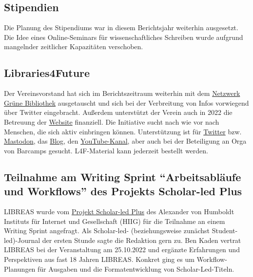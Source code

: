 \documentclass[a4paper,
fontsize=11pt,
oneside,
numbers=noperiodatend,
parskip=half-,
bibliography=totoc,
final
]{scrartcl}
\begin{document}
\hypertarget{stipendien}{%
\subsection{Stipendien}\label{stipendien}}

Die Planung des Stipendiums war in diesem Berichtsjahr weiterhin
ausgesetzt. Die Idee eines Online-Seminars für wissenschaftliches
Schreiben wurde aufgrund mangelnder zeitlicher Kapazitäten verschoben.

\hypertarget{libraries4future}{%
\subsection{Libraries4Future}\label{libraries4future}}

Der Vereinsvorstand hat sich im Berichtszeitraum weiterhin mit dem
\href{https://www.netzwerk-gruene-bibliothek.de/}{Netzwerk Grüne
Bibliothek} ausgetauscht und sich bei der Verbreitung von Infos
vorwiegend über Twitter eingebracht. Außerdem unterstützt der Verein
auch in 2022 die Betreuung der
\href{https://libraries4future.org/}{Website} finanziell. Die Initiative
sucht nach wie vor nach Menschen, die sich aktiv einbringen können.
Unterstützung ist für \href{https://twitter.com/Libraries4F}{Twitter}
bzw. \href{https://climatejustice.global/@libraries4future}{Mastodon},
das \href{https://libraries4future.org/blog/}{Blog}, den
\href{https://www.youtube.com/channel/UC2ugDvNT713LndZuONDt8-A}{YouTube-Kanal},
aber auch bei der Beteiligung an Orga von Barcamps gesucht. L4F-Material
kann jederzeit bestellt werden.

\hypertarget{teilnahme-am-writing-sprint-arbeitsabluxe4ufe-und-workflows-des-projekts-scholar-led-plus}{%
\subsection{\texorpdfstring{Teilnahme am Writing Sprint
\enquote{Arbeitsabläufe und Workflows} des Projekts Scholar-led
Plus}{Teilnahme am Writing Sprint ``Arbeitsabläufe und Workflows'' des Projekts Scholar-led Plus}}\label{teilnahme-am-writing-sprint-arbeitsabluxe4ufe-und-workflows-des-projekts-scholar-led-plus}}

LIBREAS wurde vom
\href{https://www.hiig.de/project/scholar-led-plus/}{Projekt Scholar-led
Plus} des Alexander von Humboldt Instituts für Internet und Gesellschaft
(HIIG) für die Teilnahme an einem Writing Sprint angefragt. Als
Scholar-led- (beziehungsweise zunächst Student-led)-Journal der ersten
Stunde sagte die Redaktion gern zu. Ben Kaden vertrat LIBREAS bei der
Veranstaltung am 25.10.2022 und ergänzte Erfahrungen und Perspektiven
aus fast 18 Jahren LIBREAS. Konkret ging es um Workflow-Planungen für
Ausgaben und die Formatentwicklung von Scholar-Led-Titeln.

\end{document}
